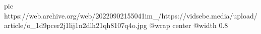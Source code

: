  
 
 
 
 

\ifcmt
  pic https://web.archive.org/web/20220902155041im_/https://vidsebe.media/upload/article/o_1d9pcer2j1lij1n2dlh21qh8107q4o.jpg
  @wrap center
  @width 0.8
\fi
